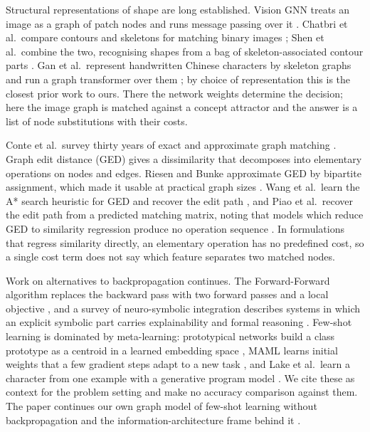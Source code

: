 Structural representations of shape are long established. Vision GNN treats an image as a graph of patch nodes and runs message passing over it \cite{han2022}. Chatbri et al.\ compare contours and skeletons for matching binary images \cite{chatbri2016}; Shen et al.\ combine the two, recognising shapes from a bag of skeleton-associated contour parts \cite{shen2016}. Gan et al.\ represent handwritten Chinese characters by skeleton graphs and run a graph transformer over them \cite{gan2023}; by choice of representation this is the closest prior work to ours. There the network weights determine the decision; here the image graph is matched against a concept attractor and the answer is a list of node substitutions with their costs.

Conte et al.\ survey thirty years of exact and approximate graph matching \cite{conte2004}. Graph edit distance (GED) gives a dissimilarity that decomposes into elementary operations on nodes and edges. Riesen and Bunke approximate GED by bipartite assignment, which made it usable at practical graph sizes \cite{riesen2009}. Wang et al.\ learn the A* search heuristic for GED and recover the edit path \cite{wang2021}, and Piao et al.\ recover the edit path from a predicted matching matrix, noting that models which reduce GED to similarity regression produce no operation sequence \cite{piao2023}. In formulations that regress similarity directly, an elementary operation has no predefined cost, so a single cost term does not say which feature separates two matched nodes.

Work on alternatives to backpropagation continues. The Forward-Forward algorithm replaces the backward pass with two forward passes and a local objective \cite{hinton2022}, and a survey of neuro-symbolic integration describes systems in which an explicit symbolic part carries explainability and formal reasoning \cite{nawaz2025}. Few-shot learning is dominated by meta-learning: prototypical networks build a class prototype as a centroid in a learned embedding space \cite{snell2017}, MAML learns initial weights that a few gradient steps adapt to a new task \cite{finn2017}, and Lake et al.\ learn a character from one example with a generative program model \cite{lake2015}. We cite these as context for the problem setting and make no accuracy comparison against them. The paper continues our own graph model of few-shot learning without backpropagation \cite{lapin2025fewshot} and the information-architecture frame behind it \cite{parzhyn2025architecture}.


